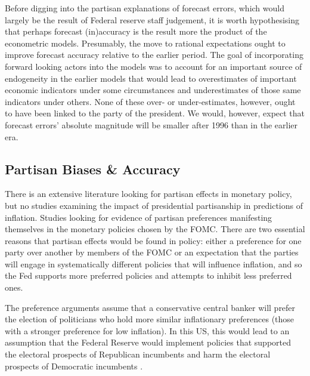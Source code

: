 \documentclass[a4paper]{article}\usepackage{graphicx, color}
\begin{document}
Before digging into the partisan explanations of forecast errors, which would largely be the result of Federal reserve staff judgement, it is worth hypothesising that perhaps forecast (in)accuracy is the result more the product of the econometric models. Presumably, the move to rational expectations ought to improve forecast accuracy relative to the earlier period. The goal of incorporating forward looking actors into the models was to account for an important source of endogeneity in the earlier models that would lead to overestimates of important economic indicators under some circumstances and underestimates of those same indicators under others. None of these over- or under-estimates, however, ought to have been linked to the party of the president. We would, however, expect that forecast errors' absolute magnitude will be smaller after 1996 than in the earlier era.


\subsection{Partisan Biases \& Accuracy}

There is an extensive literature looking for partisan effects in monetary policy, but no studies examining the impact of presidential partisanship in predictions of inflation. Studies looking for evidence of partisan preferences manifesting themselves in the monetary policies chosen by the FOMC. There are two essential reasons that partisan effects would be found in policy: either a preference for one party over another by members of the FOMC or an expectation that the parties will engage in systematically different policies that will influence inflation, and so the Fed supports more preferred policies and attempts to inhibit less preferred ones. 

The preference arguments assume that a conservative central banker will prefer the election of politicians who hold more similar inflationary preferences (those with a stronger preference for low inflation). In this US, this would lead to an assumption that the Federal Reserve would implement policies that supported the electoral prospects of Republican incumbents and harm the electoral prospects of Democratic incumbents \citep{Clark2011,Hakes1988,Sieg1997,Tootell1996}.
\end{document}
